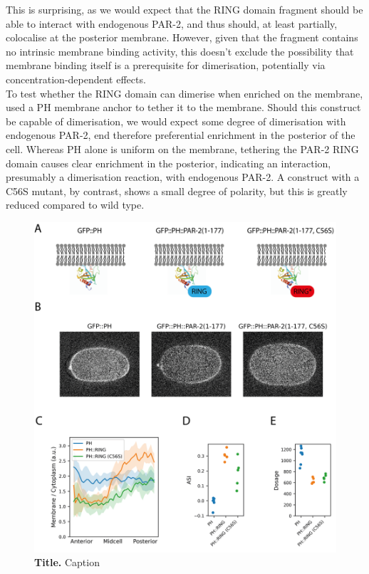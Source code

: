 \documentclass[12pt]{"article"}
\newcommand{\mycaption}[2]{\caption[#1]{\textbf{#1.} #2}}
\begin{document}
This is surprising, as we would expect that the RING domain fragment should be able to interact with endogenous PAR-2, and thus should, at least partially, colocalise at the posterior membrane. However, given that the fragment contains no intrinsic membrane binding activity, this doesn't exclude the possibility that membrane binding itself is a prerequisite for dimerisation, potentially via concentration-dependent effects.\\

To test whether the RING domain can dimerise when enriched on the membrane, used a PH membrane anchor to tether it to the membrane. Should this construct be capable of dimerisation, we would expect some degree of dimerisation with endogenous PAR-2, end therefore preferential enrichment in the posterior of the cell. Whereas PH alone is uniform on the membrane, tethering the PAR-2 RING domain causes clear enrichment in the posterior, indicating an interaction, presumably a dimerisation reaction, with endogenous PAR-2. A construct with a C56S mutant, by contrast, shows a small degree of polarity, but this is greatly reduced compared to wild type.\\

\begin{figure}[!h]
\includegraphics[scale=1]{ph_ring}
\setlength{\abovecaptionskip}{20pt}
\centering
\mycaption{Title}{Caption}
\label{fig:ph_ring}
\end{figure}
\end{document}
